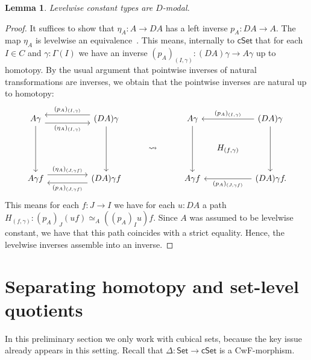 \documentclass[10pt,a4paper]{article}
\newtheorem{lemma}[theorem]{Lemma}
\theoremstyle{definition}
\theoremstyle{remark}
\newcommand{\Set}{\mathsf{Set}}
\newcommand{\cSet}{\mathsf{cSet}}
\begin{document}
\begin{lemma}\label{prop:levelwise-constant-presheaves-are-modal}
  Levelwise constant types are \(D\)-modal.
\end{lemma}
\begin{proof}
  It suffices to show that \(\eta_A \colon A \to DA\) has a left inverse \(p_A \colon DA \to A\).
  The map \(\eta_A\) is levelwise an equivalence~\cite[Proposition~3.8]{CRS21}.
  This means, internally to \(\cSet\) that for each \(I \in C\) and \(\gamma \colon \Gamma(I)\) we have an inverse \((p_A)_{(I, \gamma)} \colon (DA)\gamma \to A\gamma\) up to homotopy.
  By the usual argument that pointwise inverses of natural transformations are inverses, we obtain that the pointwise inverses are natural up to homotopy:
  \[\begin{tikzcd}
    {A\gamma} && {(DA)\gamma} && {A\gamma} && {(DA)\gamma} \\
    &&& \rightsquigarrow && {\clap{\(H_{(f, \gamma)}\)}} \\
    {A\gamma f} && {(DA)\gamma f} && {A\gamma f} && {(DA)\gamma f\clap{.}}
    \arrow[""{name=0, anchor=center, inner sep=0}, "{(\eta_A)_{(I, \gamma)}}"', shift right=2, from=1-1, to=1-3]
    \arrow[from=1-1, to=3-1]
    \arrow[""{name=1, anchor=center, inner sep=0}, "{(p_A)_{(I, \gamma)}}"', shift right=2, from=1-3, to=1-1]
    \arrow[from=1-3, to=3-3]
    \arrow[from=1-5, to=3-5]
    \arrow["{(p_A)_{(I, \gamma)}}"', from=1-7, to=1-5]
    \arrow[from=1-7, to=3-7]
    \arrow[""{name=2, anchor=center, inner sep=0}, "{(\eta_A)_{(J, \gamma f)}}", shift left=2, from=3-1, to=3-3]
    \arrow[""{name=3, anchor=center, inner sep=0}, "{(p_A)_{(J, \gamma f)}}", shift left=2, from=3-3, to=3-1]
    \arrow["{(p_A)_{(J, \gamma f)}}", from=3-7, to=3-5]
  \end{tikzcd}\]
  This means for each \(f \colon J \to I\) we have for each \(u \colon DA\) a path \(H_{(f, \gamma)} \colon (p_A)_J(uf) \simeq_{A} ((p_A)_Iu)f\).
  Since \(A\) was assumed to be levelwise constant, we have that this path coincides with a strict equality.
  Hence, the levelwise inverses assemble into an inverse.
\end{proof}



\section{Separating homotopy and set-level quotients}\label{sec:cset-hset-quotient-vs-meta-quotient}

In this preliminary section we only work with cubical sets, because the key issue already appears in this setting.
Recall that \(\Delta \colon \Set \to \cSet\) is a CwF-morphism.
\end{document}
